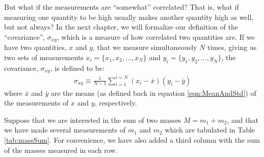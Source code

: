 But what if the measurements are ``somewhat'' correlated? That is, what if measuring one quantity to be high usually makes another quantity high as well, but not always? In the next chapter, we will formalize our definition of the ``covariance'', $\sigma_{xy}$, which is a measure of how correlated two quantities are. If we have two quantities, $x$ and $y$, that we measure simultaneously $N$ times, giving us two sets of measurements  $x_i=\{x_1, x_2,\dots, x_N\}$ and $y_i=\{y_1, y_2,\dots, y_N\}$, the covariance, $\sigma_{xy}$, is defined to be:
\begin{align}
\sigma_{xy}\equiv\frac{1}{N-1}\sum_{i=1}^{i=N}(x_i-\bar x)(y_i-\bar y)
\end{align}
where $\bar x$ and $\bar y$ are the means (as defined back in equation \ref{eqn:MeanAndStd}) of the measurements of $x$ and $y$, respectively.

Suppose that we are interested in the sum of two masses $M=m_1+m_2$, and that we have made several measurements of $m_1$ and $m_2$ which are tabulated in Table \ref{tab:massSum}. For convenience, we have also added a third column with the sum of the masses measured in each row.

